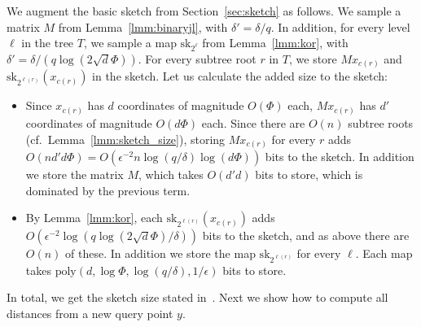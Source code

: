 We augment the basic sketch from Section~\ref{sec:sketch} as follows.
We sample a matrix $M$ from Lemma~\ref{lmm:binaryjl}, with $\delta'=\delta/q$.
In addition, for every level $\ell$ in the tree $T$, we sample a map $\mathrm{sk}_{2^\ell}$ from Lemma~\ref{lmm:kor}, with $\delta'=\delta/(q\log(2\sqrt{d}\Phi))$.
For every subtree root $r$ in $T$, we store $Mx_{c(r)}$ and $\mathrm{sk}_{2^{\ell(r)}}(x_{c(r)})$ in the sketch.
Let us calculate the added size to the sketch:

\begin{itemize}
  \item Since $x_{c(r)}$ has $d$ coordinates of magnitude $O(\Phi)$ each, $Mx_{c(r)}$ has $d'$ coordinates of magnitude $O(d\Phi)$ each. Since there are $O(n)$ subtree roots (cf.~Lemma~\ref{lmm:sketch_size}), storing $Mx_{c(r)}$ for every $r$ adds $O(nd'd\Phi)=O(\epsilon^{-2}n\log(q/\delta)\log(d\Phi))$ bits to the sketch. In addition we store the matrix $M$, which takes $O(d'd)$ bits to store, which is dominated by the previous term.
  \item By Lemma~\ref{lmm:kor}, each $\mathrm{sk}_{2^{\ell(r)}}(x_{c(r)})$ adds $O(\epsilon^{-2}\log(q\log(2\sqrt{d}\Phi)/\delta))$ bits to the sketch, and as above there are $O(n)$ of these. In addition we store the map $\mathrm{sk}_{2^{\ell(r)}}$ for every $\ell$. Each map takes $\mathrm{poly}(d,\log\Phi,\log(q/\delta),1/\epsilon)$ bits to store.
\end{itemize}
In total, we get the sketch size stated in~.
Next we show how to compute all distances from a new query point $y$.

